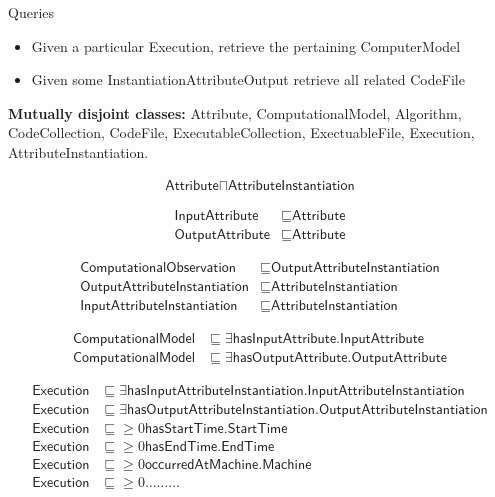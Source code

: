 \documentclass{article}
\begin{document}
%
Queries
\begin{itemize}
\item Given a particular \textsf{Execution}, retrieve the pertaining \textsf{ComputerModel}
\item Given some \textsf{InstantiationAttributeOutput} retrieve all related \textsf{CodeFile}
\end{itemize}


\bigbreak \bigbreak
\textbf{Mutually disjoint classes:} \textsf{Attribute}, \textsf{ComputationalModel}, \textsf{Algorithm}, \textsf{CodeCollection}, \textsf{CodeFile}, \textsf{ExecutableCollection},  \textsf{ExectuableFile}, 
\textsf{Execution}, \textsf{AttributeInstantiation}.

\begin{align}
\textsf{Attribute} \sqcap \textsf{AttributeInstantiation}
\end{align}

\begin{align}
\textsf{InputAttribute} &\sqsubseteq \textsf{Attribute} \\
\textsf{OutputAttribute} &\sqsubseteq \textsf{Attribute}
\end{align}

\begin{align}
\textsf{ComputationalObservation} &\sqsubseteq \textsf{OutputAttributeInstantiation} \\
\textsf{OutputAttributeInstantiation} &\sqsubseteq \textsf{AttributeInstantiation} \\
\textsf{InputAttributeInstantiation} &\sqsubseteq \textsf{AttributeInstantiation}
\end{align}

\begin{align}
\textsf{ComputationalModel} &\sqsubseteq \exists \textsf{hasInputAttribute}.\textsf{InputAttribute} \\
\textsf{ComputationalModel} &\sqsubseteq \exists \textsf{hasOutputAttribute}.\textsf{OutputAttribute}
\end{align}

\begin{align}
\textsf{Execution} &\sqsubseteq \exists \textsf{hasInputAttributeInstantiation}.\textsf{InputAttributeInstantiation} \\
\textsf{Execution} &\sqsubseteq \exists \textsf{hasOutputAttributeInstantiation}.\textsf{OutputAttributeInstantiation} \\
\textsf{Execution} &\sqsubseteq \geq 0 \textsf{hasStartTime}.\textsf{StartTime} \\
\textsf{Execution} &\sqsubseteq \geq 0 \textsf{hasEndTime}.\textsf{EndTime} \\
\textsf{Execution} &\sqsubseteq \geq 0 \textsf{occurredAtMachine}.\textsf{Machine} \\
\textsf{Execution} &\sqsubseteq \geq 0 \ldots \ldots \ldots
\end{align}
\end{document}
